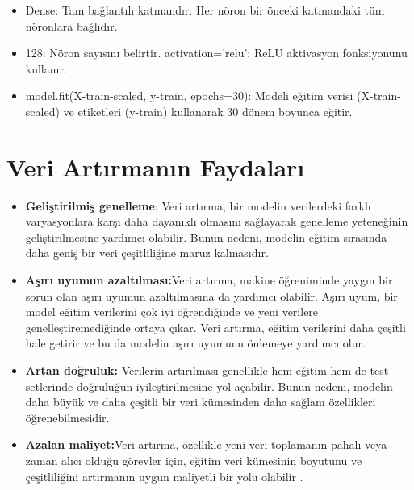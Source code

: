 \documentclass[11pt,a4paper]{report}
\begin{document}
\begin{justify}
\begin{itemize}
 	\item  Dense: Tam bağlantılı katmandır. Her nöron bir önceki katmandaki tüm nöronlara bağlıdır.
 	
 	\item  128: Nöron sayısını belirtir.
 	activation='relu': ReLU aktivasyon fonksiyonunu kullanır.\newline
 	
 	\item  model.fit(X-train-scaled, y-train, epochs=30): Modeli eğitim verisi (X-train-scaled) ve etiketleri (y-train) kullanarak 30 dönem boyunca eğitir.
 \end{itemize}
 			

 	
 	\section{Veri Artırmanın Faydaları}
 	\begin{itemize}
 		\item \textbf{Geliştirilmiş genelleme}: Veri artırma, bir modelin verilerdeki farklı varyasyonlara karşı daha dayanıklı olmasını sağlayarak genelleme yeteneğinin geliştirilmesine yardımcı olabilir. Bunun nedeni, modelin eğitim sırasında daha geniş bir veri çeşitliliğine maruz kalmasıdır.
 		\newline
 		
 		\item \textbf{Aşırı uyumun azaltılması:}Veri artırma, makine öğreniminde yaygın bir sorun olan aşırı uyumun azaltılmasına da yardımcı olabilir. Aşırı uyum, bir model eğitim verilerini çok iyi öğrendiğinde ve yeni verilere genelleştiremediğinde ortaya çıkar. Veri artırma, eğitim verilerini daha çeşitli hale getirir ve bu da modelin aşırı uyumunu önlemeye yardımcı olur.
 		
 		\item \textbf{Artan doğruluk:} Verilerin artırılması genellikle hem eğitim hem de test setlerinde doğruluğun iyileştirilmesine yol açabilir. Bunun nedeni, modelin daha büyük ve daha çeşitli bir veri kümesinden daha sağlam özellikleri öğrenebilmesidir.
 		
 		\item \textbf{Azalan maliyet:}Veri artırma, özellikle yeni veri toplamanın pahalı veya zaman alıcı olduğu görevler için, eğitim veri kümesinin boyutunu ve çeşitliliğini artırmanın uygun maliyetli bir yolu olabilir \cite{Augmentation3}.
 	\end{itemize}
 	
    \end{justify}
\end{document}
